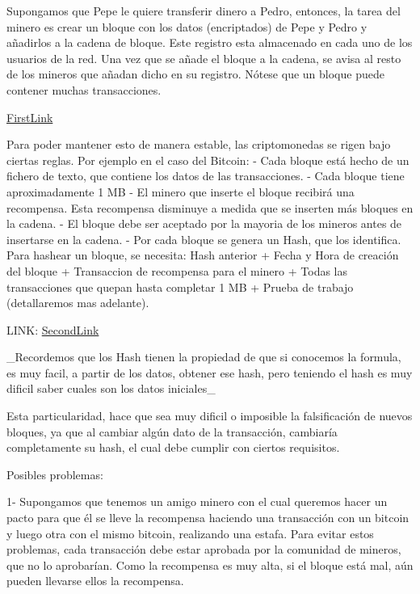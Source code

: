 \documentclass[a4paper,10pt]{article}
\begin{document}
Supongamos que Pepe le quiere transferir dinero a Pedro, entonces, la tarea del minero es crear un bloque con los datos (encriptados) de Pepe y Pedro y añadirlos a la cadena de bloque. Este registro esta almacenado en cada uno de los usuarios de la red. Una vez que se añade el bloque a la cadena, se avisa al resto de los mineros que añadan dicho en su registro.
Nótese que un bloque puede contener muchas transacciones.

\href{https://user-images.githubusercontent.com/63267942/148128644-24016ab7-d877-47fb-ba4d-23a4dd8702f3.png}{FirstLink}

Para poder mantener esto de manera estable, las criptomonedas se rigen bajo ciertas reglas. Por ejemplo en el caso del Bitcoin:
 - Cada bloque está hecho de un fichero de texto, que contiene los datos de las transacciones.
 - Cada bloque tiene aproximadamente 1 MB
 - El minero que inserte el bloque recibirá una recompensa. Esta recompensa disminuye a medida que se inserten más bloques en la cadena.
 - El bloque debe ser aceptado por la mayoria de los mineros antes de insertarse en la cadena.
 - Por cada bloque se genera un Hash, que los identifica. Para hashear un bloque, se necesita: Hash anterior + Fecha y Hora de creación del bloque + Transaccion de recompensa para el minero + Todas las transacciones que quepan hasta completar 1 MB + Prueba de trabajo (detallaremos mas adelante).

 LINK: \href{https://www.blockchain.com/btc/blocks?page=1}{SecondLink}

\_Recordemos que los Hash tienen la propiedad de que si conocemos la formula, es muy facil, a partir de los datos, obtener ese hash, pero teniendo el hash es muy dificil saber cuales son los datos iniciales\_

Esta particularidad, hace que sea muy dificil o imposible la falsificación de nuevos bloques, ya que al cambiar algún dato de la transacción, cambiaría completamente su hash, el cual debe cumplir con ciertos requisitos.

Posibles problemas:

 1- Supongamos que tenemos un amigo minero con el cual queremos hacer un pacto para que él se lleve la recompensa haciendo una transacción con un bitcoin y luego otra con el mismo bitcoin, realizando una estafa. Para evitar estos problemas, cada transacción debe estar aprobada por la comunidad de mineros, que no lo aprobarían. Como la recompensa es muy alta, si el bloque está mal, aún pueden llevarse ellos la recompensa.
\end{document}
